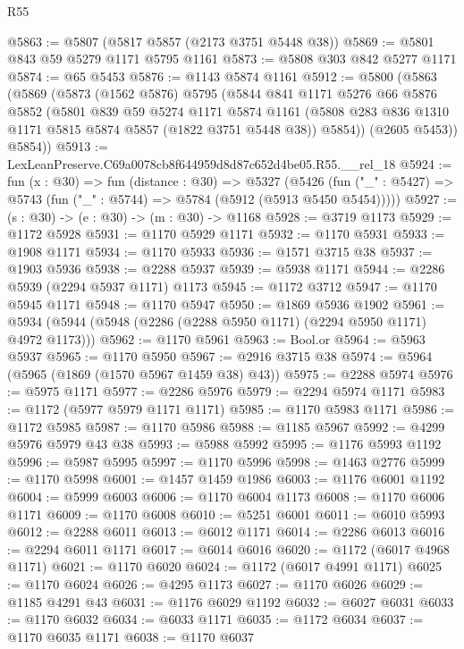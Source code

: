 \begin{lexlean}{R55}
\begin{coremodule}
@5863 := @5807 (@5817 @5857 (@2173 @3751 @5448 @38))
@5869 := @5801 @843 @59 @5279 @1171 @5795 @1161
@5873 := @5808 @303 @842 @5277 @1171
@5874 := @65 @5453
@5876 := @1143 @5874 @1161
@5912 := @5800
    (@5863
      (@5869
        (@5873
          (@1562 @5876)
          @5795
          (@5844
            @841
            @1171
            @5276
            @66
            @5876
            @5852
            (@5801
              @839
              @59
              @5274
              @1171
              @5874
              @1161
              (@5808 @283 @836 @1310 @1171 @5815 @5874 @5857 (@1822 @3751 @5448 @38))
              @5854))
          (@2605 @5453))
        @5854))
@5913 := LexLeanPreserve.C69a0078cb8f644959d8d87c652d4be05.R55.__rel_18
@5924 := fun (x : @30) =>
  fun (distance : @30) =>
  @5327
    (@5426 (fun ("_" : @5427) => @5743 (fun ("_" : @5744) => @5784 (@5912 (@5913 @5450 @5454)))))
@5927 := (s : @30) -> (e : @30) -> (m : @30) -> @1168
@5928 := @3719 @1173
@5929 := @1172 @5928
@5931 := @1170 @5929 @1171
@5932 := @1170 @5931
@5933 := @1908 @1171
@5934 := @1170 @5933
@5936 := @1571 @3715 @38
@5937 := @1903 @5936
@5938 := @2288 @5937
@5939 := @5938 @1171
@5944 := @2286 @5939 (@2294 @5937 @1171) @1173
@5945 := @1172 @3712
@5947 := @1170 @5945 @1171
@5948 := @1170 @5947
@5950 := @1869 @5936 @1902
@5961 := @5934 (@5944 (@5948 (@2286 (@2288 @5950 @1171) (@2294 @5950 @1171) @4972 @1173)))
@5962 := @1170 @5961
@5963 := Bool.or
@5964 := @5963 @5937
@5965 := @1170 @5950
@5967 := @2916 @3715 @38
@5974 := @5964 (@5965 (@1869 (@1570 @5967 @1459 @38) @43))
@5975 := @2288 @5974
@5976 := @5975 @1171
@5977 := @2286 @5976
@5979 := @2294 @5974 @1171
@5983 := @1172 (@5977 @5979 @1171 @1171)
@5985 := @1170 @5983 @1171
@5986 := @1172 @5985
@5987 := @1170 @5986
@5988 := @1185 @5967
@5992 := @4299 @5976 @5979 @43 @38
@5993 := @5988 @5992
@5995 := @1176 @5993 @1192
@5996 := @5987 @5995
@5997 := @1170 @5996
@5998 := @1463 @2776
@5999 := @1170 @5998
@6001 := @1457 @1459 @1986
@6003 := @1176 @6001 @1192
@6004 := @5999 @6003
@6006 := @1170 @6004 @1173
@6008 := @1170 @6006 @1171
@6009 := @1170 @6008
@6010 := @5251 @6001
@6011 := @6010 @5993
@6012 := @2288 @6011
@6013 := @6012 @1171
@6014 := @2286 @6013
@6016 := @2294 @6011 @1171
@6017 := @6014 @6016
@6020 := @1172 (@6017 @4968 @1171)
@6021 := @1170 @6020
@6024 := @1172 (@6017 @4991 @1171)
@6025 := @1170 @6024
@6026 := @4295 @1173
@6027 := @1170 @6026
@6029 := @1185 @4291 @43
@6031 := @1176 @6029 @1192
@6032 := @6027 @6031
@6033 := @1170 @6032
@6034 := @6033 @1171
@6035 := @1172 @6034
@6037 := @1170 @6035 @1171
@6038 := @1170 @6037

\end{coremodule}
\end{lexlean}
